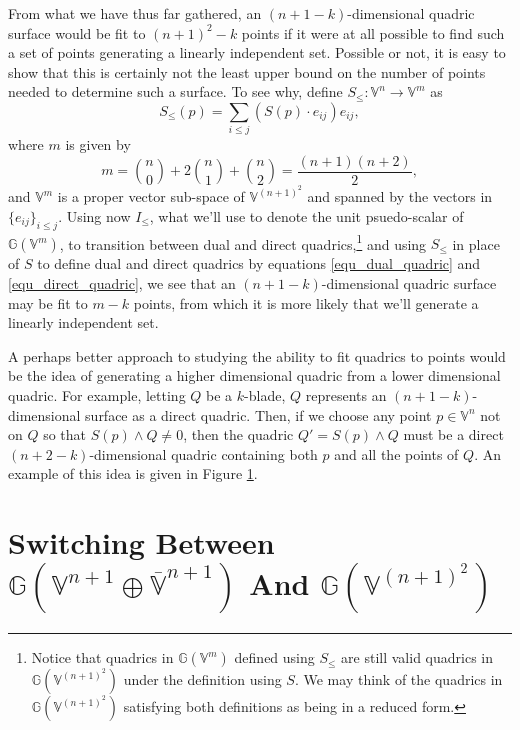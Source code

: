 \documentclass{birkjour}
\theoremstyle{definition}
\theoremstyle{remark}
\numberwithin{equation}{section}
\newcommand{\G}{\mathbb{G}}
\newcommand{\V}{\mathbb{V}}
\newcommand{\Vb}{\mathbb{\overline{V}}}
\begin{document}
From what we have thus far gathered, an $(n+1-k)$-dimensional quadric surface
would be fit to $(n+1)^2-k$ points if it were at all possible to find such a set
of points generating a linearly independent set.  Possible or not, it is easy to show that this
is certainly not the least upper bound on the number of points needed to determine
such a surface.  To see why, define $S_{\leq}:\V^n\to\V^m$ as
\begin{equation}
S_{\leq}(p) = \sum_{i\leq j}(S(p)\cdot e_{ij})e_{ij},
\end{equation}
where $m$ is given by
\begin{equation}
m = \binom{n}{0}+2\binom{n}{1}+\binom{n}{2} = \frac{(n+1)(n+2)}{2},
\end{equation}
and $\V^m$ is a proper vector sub-space of $\V^{(n+1)^2}$ and spanned
by the vectors in $\{e_{ij}\}_{i\leq j}$.
Using now $I_{\leq}$, what we'll use to denote the unit psuedo-scalar of $\G(\V^m)$,
to transition between dual and direct quadrics,\footnote{Notice that quadrics in $\G(\V^m)$
defined using $S_{\leq}$ are still valid quadrics in $\G(\V^{(n+1)^2})$ under the definition
using $S$.  We may think of the
quadrics in $\G(\V^{(n+1)^2})$ satisfying both definitions as being in a reduced form.}
and using $S_{\leq}$ in place of $S$
to define dual and direct quadrics by equations \eqref{equ_dual_quadric} and
\eqref{equ_direct_quadric}, we see that
an $(n+1-k)$-dimensional quadric surface may be fit to $m-k$ points, from which it
is more likely that we'll generate a linearly independent set.

A perhaps better approach to studying the ability to fit quadrics to
points would be the idea of generating a higher dimensional quadric
from a lower dimensional quadric.  For example, letting $Q$ be a $k$-blade, $Q$
represents an $(n+1-k)$-dimensional surface as a direct quadric.  Then,
if we choose any point $p\in\V^n$ not on $Q$ so that $S(p)\wedge Q\neq 0$,
then the quadric $Q'=S(p)\wedge Q$ must be a direct $(n+2-k)$-dimensional quadric containing
both $p$ and all the points of $Q$.  An example of this idea is given in Figure \ref{}.



\section{Switching Between $\G(\V^{n+1}\oplus\Vb^{n+1})$ And $\G(\V^{(n+1)^2})$}
\end{document}
